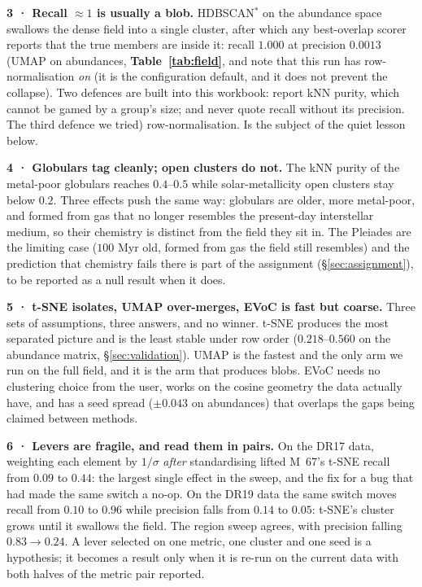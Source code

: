 \textbf{3 · Recall $\approx 1$ is usually a blob.} HDBSCAN$^*$ on the abundance
space swallows the dense field into a single cluster, after which any
best-overlap scorer reports that the true members are inside it: recall $1.000$
at precision $0.0013$ (UMAP on abundances, \textbf{Table~\ref{tab:field}}, and
note that this run has row-normalisation \emph{on} (it is the configuration
default, and it does not prevent the collapse). Two defences are built into
this workbook: report kNN purity, which cannot be gamed by a group's size; and
never quote recall without its precision. The third defence we tried)
row-normalisation. Is the subject of the quiet lesson below.

\textbf{4 · Globulars tag cleanly; open clusters do not.} The kNN purity of the
metal-poor globulars reaches $0.4$--$0.5$ while solar-metallicity open clusters
stay below $0.2$. Three effects push the same way: globulars are older, more
metal-poor, and formed from gas that no longer resembles the present-day
interstellar medium, so their chemistry is distinct from the field they sit in.
The Pleiades are the limiting case ($100$ Myr old, formed from gas the field
still resembles) and the prediction that chemistry fails there is part of the
assignment (\S\ref{sec:assignment}), to be reported as a null result when it
does.

\textbf{5 · t-SNE isolates, UMAP over-merges, EVoC is fast but coarse.} Three
sets of assumptions, three answers, and no winner. t-SNE produces the most
separated picture and is the least stable under row order
($0.218$--$0.560$ on the abundance matrix, \S\ref{sec:validation}). UMAP is
the fastest and the only arm we run on the full field, and it is the arm that
produces blobs. EVoC needs no clustering choice from the user, works on the
cosine geometry the data actually have, and has a seed spread
($\pm0.043$ on abundances) that overlaps the gaps being claimed between
methods.

\textbf{6 · Levers are fragile, and read them in pairs.} On the DR17 data,
weighting each element by $1/\sigma$ \emph{after} standardising lifted M~67's
t-SNE recall from $0.09$ to $0.44$: the largest single effect in the sweep, and
the fix for a bug that had made the same switch a no-op. On the DR19 data the
same switch moves recall from $0.10$ to $0.96$ while precision falls from
$0.14$ to $0.05$: t-SNE's cluster grows until it swallows the field. The region
sweep agrees, with precision falling $0.83 \rightarrow 0.24$. A lever selected
on one metric, one cluster and one seed is a hypothesis; it becomes a result
only when it is re-run on the current data with both halves of the metric pair
reported.

